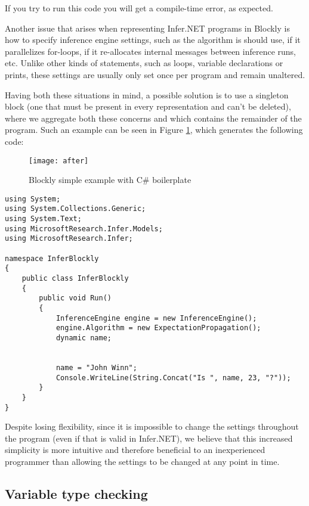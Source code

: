 If you try to run this code you will get a compile-time error, as expected.

Another issue that arises when representing Infer.NET programs in Blockly is how
to specify inference engine settings, such as the algorithm is should use, if it
parallelizes for-loops, if it re-allocates internal messages between inference
runs, etc. Unlike other kinds of statements, such as loops, variable declarations
or prints, these settings are usually only set once per program and remain
unaltered.

Having both these situations in mind, a possible solution is to use a singleton
block (one that must be present in every representation and can't be deleted),
where we aggregate both these concerns and which contains the remainder of the program.
Such an example can be seen in Figure \ref{fig:after}, which generates the following code:

\begin{figure}[t]
  \begin{center}
    \leavevmode
    \texttt{[image: after]}
    \caption{Blockly simple example with C# boilerplate}
    \label{fig:after}
  \end{center}
\end{figure}

\begin{lstlisting}
using System;
using System.Collections.Generic;
using System.Text;
using MicrosoftResearch.Infer.Models;
using MicrosoftResearch.Infer;

namespace InferBlockly
{
	public class InferBlockly
	{
		public void Run()
		{
			InferenceEngine engine = new InferenceEngine();
			engine.Algorithm = new ExpectationPropagation();
			dynamic name;


			name = "John Winn";
			Console.WriteLine(String.Concat("Is ", name, 23, "?"));
		}
	}
}
\end{lstlisting}

Despite losing flexibility, since it is impossible to change the settings
throughout the program (even if that is valid in Infer.NET),
we believe that this increased simplicity is more intuitive and therefore beneficial to an inexperienced
programmer than allowing the settings to be changed at any point in time.

\subsection{Variable type checking}

